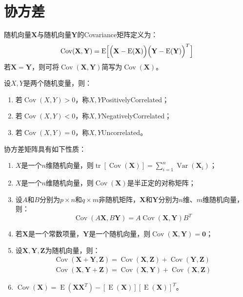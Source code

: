 \section{协方差}

\begin{definition}
	随机向量$\mathbf{X}$与随机向量$\mathbf{Y}$的\gls{Covariance}矩阵定义为：
	\begin{equation*}
		\operatorname{Cov}(\mathbf{X},\mathbf{Y})=\operatorname{E}\Bigl[\Bigl(\mathbf{X}-\operatorname{E}(\mathbf{X})\Bigr)\Bigl(\mathbf{Y}-\operatorname{E}(\mathbf{Y})\Bigr)^T\Bigr]
	\end{equation*}
	若$\mathbf{X}=\mathbf{Y}$，则可将$\operatorname{Cov}(\mathbf{X},\mathbf{Y})$简写为$\operatorname{Cov}(\mathbf{X})$。
\end{definition}
\begin{definition}
	设$X,Y$是两个随机变量，则：
	\begin{enumerate}
		\item 若$\operatorname{Cov}(X,Y)>0$，称$X,Y$\gls{PositivelyCorrelated}；
		\item 若$\operatorname{Cov}(X,Y)<0$，称$X,Y$\gls{NegativelyCorrelated}；
		\item 若$\operatorname{Cov}(X,Y)=0$，称$X,Y$\gls{Uncorrelated}。
	\end{enumerate}
\end{definition}
\begin{property}\label{prop:CovMat}
	协方差矩阵具有如下性质：
	\begin{enumerate}
		\item $X$是一个$n$维随机向量，则$\operatorname{tr}[\operatorname{Cov}(\mathbf{X})]=\sum\limits_{i=1}^{n}\operatorname{Var}(\mathbf{X}_i)$；
		\item $X$是一个$n$维随机向量，则$\operatorname{Cov}(\mathbf{X})$是半正定的对称矩阵；
		\item 设$A$和$B$分别为$p\times n$和$q\times m$非随机矩阵，$\mathbf{X}$和$\mathbf{Y}$分别为$n$维、$m$维随机向量，则：
		\begin{equation*}
			\operatorname{Cov}(A\mathbf{X},B\mathbf{Y})=A\operatorname{Cov}(\mathbf{X},\mathbf{Y})B^T
		\end{equation*}
		\item 若$\mathbf{X}$是一个常数项量，$\mathbf{Y}$是一个随机向量，则$\operatorname{Cov}(\mathbf{X},\mathbf{Y})=\mathbf{0}$；
		\item 设$\mathbf{X},\mathbf{Y},\mathbf{Z}$为随机向量，则：
		\begin{gather*}
			\operatorname{Cov}(\mathbf{X}+\mathbf{Y},\mathbf{Z})=\operatorname{Cov}(\mathbf{X},\mathbf{Z})+\operatorname{Cov}(\mathbf{Y},\mathbf{Z}) \\
			\operatorname{Cov}(\mathbf{X},\mathbf{Y}+\mathbf{Z})=\operatorname{Cov}(\mathbf{X},\mathbf{Y})+\operatorname{Cov}(\mathbf{X},\mathbf{Z})
		\end{gather*}
		\item $\operatorname{Cov}(\mathbf{X})=\operatorname{E}(\mathbf{X}\mathbf{X}^T)-[\operatorname{E}(\mathbf{X})][\operatorname{E}(\mathbf{X})]^T$。
	\end{enumerate}
\end{property}
